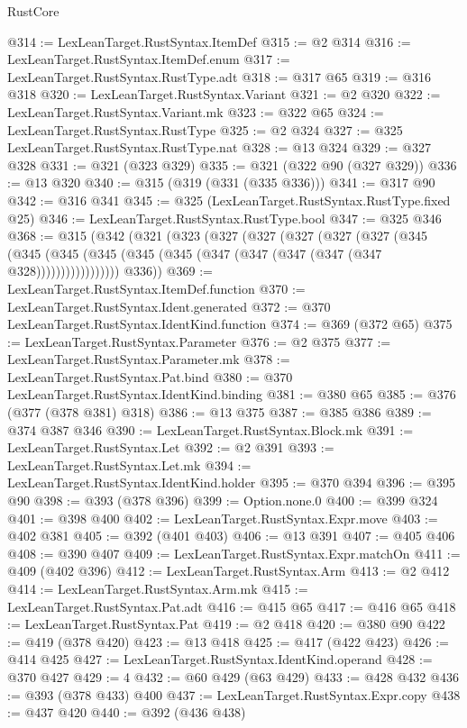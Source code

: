 \begin{lexlean}{RustCore}
\begin{coremodule}
@314 := LexLeanTarget.RustSyntax.ItemDef
@315 := @2 @314
@316 := LexLeanTarget.RustSyntax.ItemDef.enum
@317 := LexLeanTarget.RustSyntax.RustType.adt
@318 := @317 @65
@319 := @316 @318
@320 := LexLeanTarget.RustSyntax.Variant
@321 := @2 @320
@322 := LexLeanTarget.RustSyntax.Variant.mk
@323 := @322 @65
@324 := LexLeanTarget.RustSyntax.RustType
@325 := @2 @324
@327 := @325 LexLeanTarget.RustSyntax.RustType.nat
@328 := @13 @324
@329 := @327 @328
@331 := @321 (@323 @329)
@335 := @321 (@322 @90 (@327 @329))
@336 := @13 @320
@340 := @315 (@319 (@331 (@335 @336)))
@341 := @317 @90
@342 := @316 @341
@345 := @325 (LexLeanTarget.RustSyntax.RustType.fixed @25)
@346 := LexLeanTarget.RustSyntax.RustType.bool
@347 := @325 @346
@368 := @315
    (@342
      (@321
        (@323
          (@327
            (@327
              (@327
                (@327
                  (@327
                    (@345
                      (@345
                        (@345 (@345 (@345 (@345 (@347 (@347 (@347 (@347 (@347 @328)))))))))))))))))
        @336))
@369 := LexLeanTarget.RustSyntax.ItemDef.function
@370 := LexLeanTarget.RustSyntax.Ident.generated
@372 := @370 LexLeanTarget.RustSyntax.IdentKind.function
@374 := @369 (@372 @65)
@375 := LexLeanTarget.RustSyntax.Parameter
@376 := @2 @375
@377 := LexLeanTarget.RustSyntax.Parameter.mk
@378 := LexLeanTarget.RustSyntax.Pat.bind
@380 := @370 LexLeanTarget.RustSyntax.IdentKind.binding
@381 := @380 @65
@385 := @376 (@377 (@378 @381) @318)
@386 := @13 @375
@387 := @385 @386
@389 := @374 @387 @346
@390 := LexLeanTarget.RustSyntax.Block.mk
@391 := LexLeanTarget.RustSyntax.Let
@392 := @2 @391
@393 := LexLeanTarget.RustSyntax.Let.mk
@394 := LexLeanTarget.RustSyntax.IdentKind.holder
@395 := @370 @394
@396 := @395 @90
@398 := @393 (@378 @396)
@399 := Option.none.{0}
@400 := @399 @324
@401 := @398 @400
@402 := LexLeanTarget.RustSyntax.Expr.move
@403 := @402 @381
@405 := @392 (@401 @403)
@406 := @13 @391
@407 := @405 @406
@408 := @390 @407
@409 := LexLeanTarget.RustSyntax.Expr.matchOn
@411 := @409 (@402 @396)
@412 := LexLeanTarget.RustSyntax.Arm
@413 := @2 @412
@414 := LexLeanTarget.RustSyntax.Arm.mk
@415 := LexLeanTarget.RustSyntax.Pat.adt
@416 := @415 @65
@417 := @416 @65
@418 := LexLeanTarget.RustSyntax.Pat
@419 := @2 @418
@420 := @380 @90
@422 := @419 (@378 @420)
@423 := @13 @418
@425 := @417 (@422 @423)
@426 := @414 @425
@427 := LexLeanTarget.RustSyntax.IdentKind.operand
@428 := @370 @427
@429 := 4
@432 := @60 @429 (@63 @429)
@433 := @428 @432
@436 := @393 (@378 @433) @400
@437 := LexLeanTarget.RustSyntax.Expr.copy
@438 := @437 @420
@440 := @392 (@436 @438)

\end{coremodule}
\end{lexlean}
